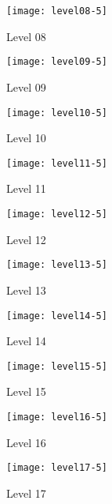 \begin{figure}
  \centering
  \texttt{[image: level08-5]}
  \caption{Level 08}
  \label{fig:level08-stats}
\end{figure}

\begin{figure}
  \centering
  \texttt{[image: level09-5]}
  \caption{Level 09}
  \label{fig:level09-stats}
\end{figure}
 
\begin{figure}
  \centering
  \texttt{[image: level10-5]}
  \caption{Level 10}
  \label{fig:level10-stats}
\end{figure}

\clearpage

\begin{figure}
  \centering
  \texttt{[image: level11-5]}
  \caption{Level 11}
  \label{fig:level11-stats}
\end{figure}
 
\begin{figure}
  \centering
  \texttt{[image: level12-5]}
  \caption{Level 12}
  \label{fig:level12-stats}
\end{figure}

\begin{figure}
  \centering
  \texttt{[image: level13-5]}
  \caption{Level 13}
  \label{fig:level13-stats}
\end{figure}

\begin{figure}
  \centering
  \texttt{[image: level14-5]}
  \caption{Level 14}
  \label{fig:level14-stats}
\end{figure}
 
\begin{figure}
  \centering
  \texttt{[image: level15-5]}
  \caption{Level 15}
  \label{fig:level15-stats}
\end{figure}

\begin{figure}
  \centering
  \texttt{[image: level16-5]}
  \caption{Level 16}
  \label{fig:level16-stats}
\end{figure}
 
\begin{figure}
  \centering
  \texttt{[image: level17-5]}
  \caption{Level 17}
  \label{fig:level17-stats}
\end{figure}

